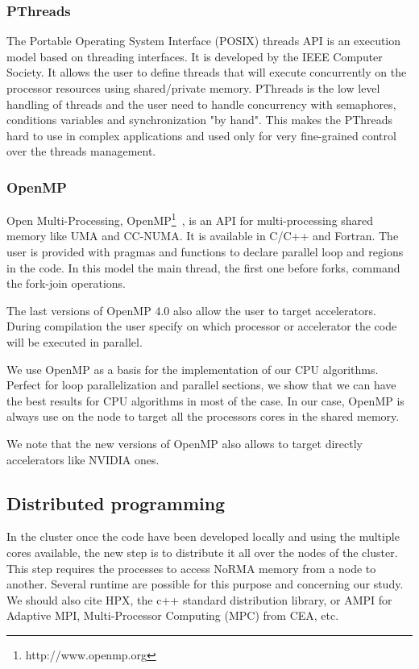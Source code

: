 \subsubsection{PThreads}
The Portable Operating System Interface (POSIX) threads API is an execution model based on threading interfaces. 
It is developed by the IEEE Computer Society. 
It allows the user to define threads that will execute concurrently on the processor resources using shared/private memory.
PThreads is the low level handling of threads and the user need to handle concurrency with semaphores, conditions variables and synchronization "by hand".
This makes the PThreads hard to use in complex applications and used only for very fine-grained control over the threads management. 

\subsubsection{OpenMP}
Open Multi-Processing, OpenMP\footnote{http://www.openmp.org}~\cite{chapman2008using,supinski2017scaling}, is an API for multi-processing shared memory like UMA and CC-NUMA.
It is available in C/C++ and Fortran.
The user is provided with pragmas and functions to declare parallel loop and regions in the code. 
In this model the main thread, the first one before forks, command the fork-join operations. 

The last versions of OpenMP 4.0 also allow the user to target accelerators. 
During compilation the user specify on which processor or accelerator the code will be executed in parallel. 

We use OpenMP as a basis for the implementation of our CPU algorithms. 
Perfect for loop parallelization and parallel sections, we show that we can have the best results for CPU algorithms in most of the case. 
In our case, OpenMP is always use on the node to target all the processors cores in the shared memory. 

We note that the new versions of OpenMP also allows to target directly accelerators like NVIDIA ones. 

\subsection{Distributed programming}
In the cluster once the code have been developed locally and using the multiple cores available, the new step is to distribute it all over the nodes of the cluster. 
This step requires the processes to access NoRMA memory from a node to another. 
Several runtime are possible for this purpose and concerning our study. 
We should also cite HPX, the c++ standard distribution library, or AMPI for Adaptive MPI, Multi-Processor Computing (MPC) from CEA, etc.

